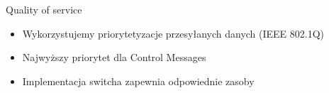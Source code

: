 \documentclass[compress,red]{beamer}
\begin{document}
\begin{frame}{Quality of service}


  \begin{itemize}
    \item Wykorzystujemy priorytetyzacje przesyłanych danych (IEEE 802.1Q)
    \item Najwyższy priorytet dla Control Messages
    \item Implementacja switcha zapewnia odpowiednie zasoby
  \end{itemize}

\end{frame}
\end{document}
